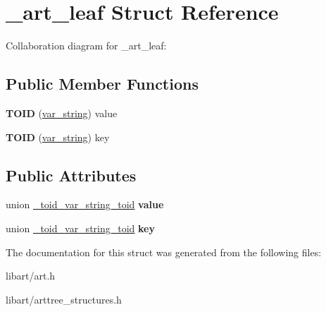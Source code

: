 \hypertarget{struct__art__leaf}{}\section{\+\_\+art\+\_\+leaf Struct Reference}
\label{struct__art__leaf}


Collaboration diagram for \+\_\+art\+\_\+leaf\+:
\subsection*{Public Member Functions}
\begin{DoxyCompactItemize}
\item 
\mbox{\label{struct__art__leaf_a11e2deac1bcf5f88bb066a32351fe72c}} 
{\bfseries T\+O\+ID} (\hyperlink{struct__var__string}{var\+\_\+string}) value
\item 
\mbox{\label{struct__art__leaf_a417bccd10d0c812fefaf1f435561a26a}} 
{\bfseries T\+O\+ID} (\hyperlink{struct__var__string}{var\+\_\+string}) key
\end{DoxyCompactItemize}
\subsection*{Public Attributes}
\begin{DoxyCompactItemize}
\item 
\mbox{\label{struct__art__leaf_a3fc012976033db80eafceef0c304bd5a}} 
union \hyperlink{union__toid__var__string__toid}{\+\_\+toid\+\_\+var\+\_\+string\+\_\+toid} {\bfseries value}
\item 
\mbox{\label{struct__art__leaf_a1d867c7c6f1a06ad8a0ebf4b030a201d}} 
union \hyperlink{union__toid__var__string__toid}{\+\_\+toid\+\_\+var\+\_\+string\+\_\+toid} {\bfseries key}
\end{DoxyCompactItemize}


The documentation for this struct was generated from the following files\+:\begin{DoxyCompactItemize}
\item 
libart/art.\+h\item 
libart/arttree\+\_\+structures.\+h\end{DoxyCompactItemize}

